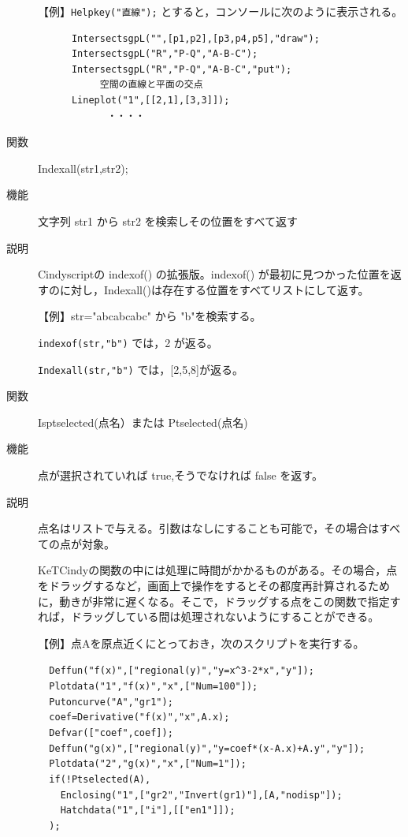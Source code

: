 \documentclass[papersize,a4paper,12pt,uplatex]{jsarticle}
\begin{document}
\begin{description}
\vspace{\baselineskip}
【例】\verb|Helpkey("直線");|  とすると，コンソールに次のように表示される。
\begin{verbatim}
      IntersectsgpL("",[p1,p2],[p3,p4,p5],"draw"); 
      IntersectsgpL("R","P-Q","A-B-C"); 
      IntersectsgpL("R","P-Q","A-B-C","put");
           空間の直線と平面の交点
      Lineplot("1",[[2,1],[3,3]]);
         　　・・・・
\end{verbatim}

\vspace{\baselineskip}
\hypertarget{indexall}{}
\item[関数]  Indexall(str1,str2);
\item[機能]  文字列 str1 から str2 を検索しその位置をすべて返す
\item[説明]  Cindyscriptの indexof() の拡張版。indexof() が最初に見つかった位置を返すのに対し，Indexall()は存在する位置をすべてリストにして返す。

\vspace{\baselineskip}
【例】str="abcabcabc" から "b"を検索する。

\verb|indexof(str,"b")| では，2 が返る。

\verb|Indexall(str,"b")| では，[2,5,8]が返る。

\vspace{\baselineskip}
\hypertarget{isptselected}{}
\item[関数]  Isptselected(点名）または Ptselected(点名)
\item[機能]  点が選択されていれば true,そうでなければ false を返す。
\item[説明]  点名はリストで与える。引数はなしにすることも可能で，その場合はすべての点が対象。

KeTCindyの関数の中には処理に時間がかかるものがある。その場合，点をドラッグするなど，画面上で操作をするとその都度再計算されるために，動きが非常に遅くなる。そこで，ドラッグする点をこの関数で指定すれば，ドラッグしている間は処理されないようにすることができる。

\vspace{\baselineskip}
【例】点Aを原点近くにとっておき，次のスクリプトを実行する。

\verb|  Deffun("f(x)",["regional(y)","y=x^3-2*x","y"]);|\\
\verb|  Plotdata("1","f(x)","x",["Num=100"]);|\\
\verb|  Putoncurve("A","gr1");|\\
\verb|  coef=Derivative("f(x)","x",A.x);|\\
\verb|  Defvar(["coef",coef]);|\\
\verb|  Deffun("g(x)",["regional(y)","y=coef*(x-A.x)+A.y","y"]);|\\
\verb|  Plotdata("2","g(x)","x",["Num=1"]);|\\
\verb|  if(!Ptselected(A),|\\
\verb|    Enclosing("1",["gr2","Invert(gr1)"],[A,"nodisp"]);|\\
\verb|    Hatchdata("1",["i"],[["en1"]]);|\\
\verb|  );|


\end{description}
\end{document}
